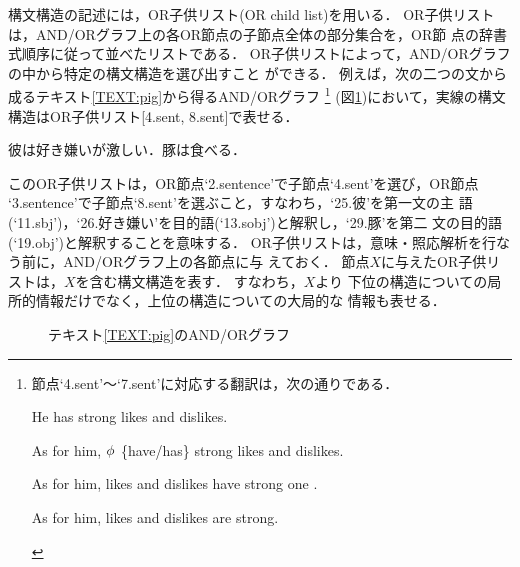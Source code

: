 構文構造の記述には，OR子供リスト(OR child list)\cite{Tamura91}を用いる．
OR子供リストは，AND/ORグラフ上の各OR節点の子節点全体の部分集合を，OR節
点の辞書式順序に従って並べたリストである．
OR子供リストによって，AND/ORグラフの中から特定の構文構造を選び出すこと
ができる．
例えば，次の二つの文から成るテキスト\ref{TEXT:pig}から得るAND/ORグラフ
\footnote{節点`4.sent'〜`7.sent'に対応する翻訳は，次の通りである．
\begin{list}{}{\parsep -3pt \itemsep 0pt \topsep -15pt
\addtocounter{myctr1}{3}
\renewcommand{\makelabel}{}}
\item He has strong likes and dislikes. 
\item As for him, $\phi_{}$ \{have/has\} strong likes and dislikes.
\item As for him, likes and dislikes have strong one .
\item As for him, likes and dislikes are strong.
\end{list}
}
(図\ref{fig:andor})において，実線の構文構造はOR子供リスト[4.sent,
8.sent]で表せる．
\begin{TEXT}
\text 彼は好き嫌いが激しい．豚は食べる．\label{TEXT:pig}
\end{TEXT}
このOR子供リストは，OR節点`2.sentence'で子節点`4.sent'を選び，OR節点
`3.sentence'で子節点`8.sent'を選ぶこと，すなわち，`25.彼'を第一文の主
語(`11.sbj')，`26.好き嫌い'を目的語(`13.sobj')と解釈し，`29.豚'を第二
文の目的語(`19.obj')と解釈することを意味する．
OR子供リストは，意味・照応解析を行なう前に，AND/ORグラフ上の各節点に与
えておく．
節点$X$に与えたOR子供リストは，$X$を含む構文構造を表す．
すなわち，$X$より
下位の構造についての局所的情報だけでなく，上位の構造についての大局的な
情報も表せる．
\begin{figure}[htbp]
\begin{center}
\end{center}
\caption{テキスト\protect\ref{TEXT:pig}のAND/ORグラフ}
\label{fig:andor}
\end{figure}

